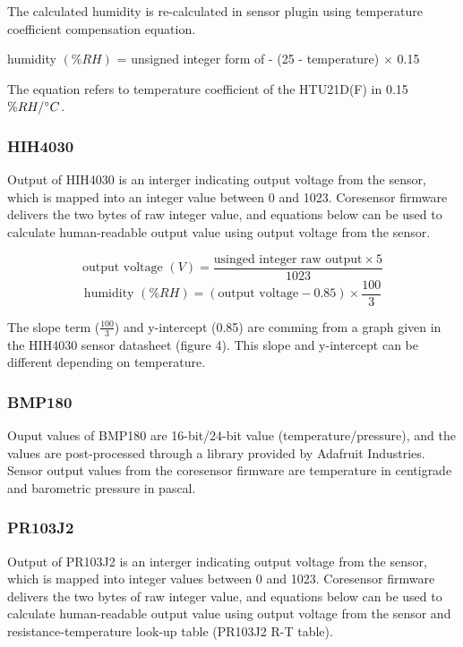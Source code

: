 \bigbreak
 The calculated humidity is re-calculated in sensor plugin using temperature coefficient compensation equation. \\

{\centering
 humidity \((\%RH)\) = unsigned integer form of  - (25 - temperature) $\times$ 0.15
 \par
}

\bigbreak
The equation refers to temperature coefficient of the HTU21D(F) in 0.15 \(\%RH/\degree C\).

\subsubsection{ HIH4030}

Output of HIH4030 is an interger indicating output voltage from the sensor, which is mapped into an integer value between 0 and 1023. Coresensor firmware delivers the two bytes of raw integer value, and equations below can be used to calculate human-readable output value using output voltage from the sensor.

{\centering
 \[ \text{output voltage \((V)\)} = \frac{\text{usinged integer raw output} \times 5}{1023} \] 
 \[ \text{humidity \((\%RH)\)} = (\text{output voltage} - 0.85) \times \frac{100}{3} \]
 \par
 }
\bigbreak
The slope term (\(\frac{100}{3}\)) and y-intercept (0.85) are comming from a graph given in the HIH4030 sensor datasheet (figure 4). This slope and y-intercept can be different depending on temperature.

\subsubsection{ BMP180}

Ouput values of BMP180 are 16-bit/24-bit value (temperature/pressure), and the values are post-processed through a library provided by Adafruit Industries. Sensor output values from the coresensor firmware are temperature in centigrade and barometric pressure in pascal.


\subsubsection{ PR103J2}

Output of PR103J2 is an interger indicating output voltage from the sensor, which is mapped into integer values between 0 and 1023. Coresensor firmware delivers the two bytes of raw integer value, and equations below can be used to calculate human-readable output value using output voltage from the sensor and resistance-temperature look-up table (PR103J2 R-T table).

